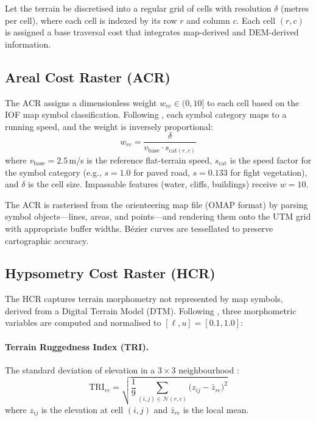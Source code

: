 \documentclass[11pt,a4paper]{article}
\begin{document}
Let the terrain be discretised into a regular grid of cells with resolution $\delta$ (metres per cell), where each cell is indexed by its row $r$ and column $c$.
Each cell $(r,c)$ is assigned a base traversal cost that integrates map-derived and DEM-derived information.

\subsection{Areal Cost Raster (ACR)}
\label{sec:acr}

The ACR assigns a dimensionless weight $w_{rc} \in (0, 10]$ to each cell based on the IOF map symbol classification.
Following \citet{ica2021lcp}, each symbol category maps to a running speed, and the weight is inversely proportional:
\begin{equation}
  w_{rc} = \frac{\delta}{v_{\text{base}} \cdot s_{\text{cat}(r,c)}}
  \label{eq:acr}
\end{equation}
where $v_{\text{base}} = 2.5$\,m/s is the reference flat-terrain speed, $s_{\text{cat}}$ is the speed factor for the symbol category (e.g., $s = 1.0$ for paved road, $s = 0.133$ for fight vegetation), and $\delta$ is the cell size.
Impassable features (water, cliffs, buildings) receive $w = 10$.

The ACR is rasterised from the orienteering map file (OMAP format) by parsing symbol objects---lines, areas, and points---and rendering them onto the UTM grid with appropriate buffer widths.
B\'{e}zier curves are tessellated to preserve cartographic accuracy.

\subsection{Hypsometry Cost Raster (HCR)}
\label{sec:hcr}

The HCR captures terrain morphometry not represented by map symbols, derived from a Digital Terrain Model (DTM).
Following \citet{ica2021lcp}, three morphometric variables are computed and normalised to $[\ell, u] = [0.1, 1.0]$:

\paragraph{Terrain Ruggedness Index (TRI).}
The standard deviation of elevation in a $3 \times 3$ neighbourhood \citep{riley1999tri}:
\begin{equation}
  \text{TRI}_{rc} = \sqrt{\frac{1}{9}\sum_{(i,j) \in \mathcal{N}(r,c)} \bigl(z_{ij} - \bar{z}_{rc}\bigr)^2}
  \label{eq:tri}
\end{equation}
where $z_{ij}$ is the elevation at cell $(i,j)$ and $\bar{z}_{rc}$ is the local mean.
\end{document}
